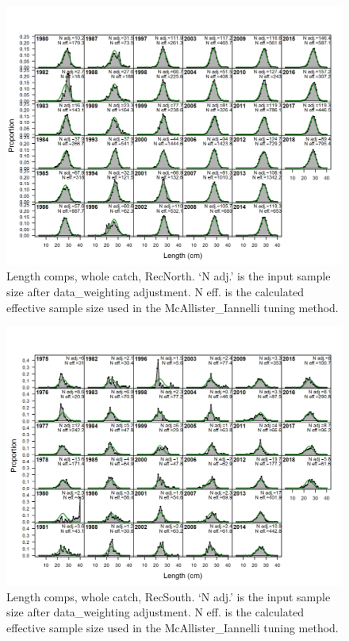\documentclass[12pt,]{article}
\begin{document}
\begin{figure}
\centering
\includegraphics{./r4ss/plots_mod1/comp_lenfit_flt3mkt0.png}
\caption{Length comps, whole catch, RecNorth. `N adj.' is the input
sample size after data\_weighting adjustment. N eff. is the calculated
effective sample size used in the McAllister\_Iannelli tuning method.
\label{fig:mod1_3_comp_lenfit_flt3mkt0}}
\end{figure}

\begin{figure}
\centering
\includegraphics{./r4ss/plots_mod1/comp_lenfit_flt4mkt0.png}
\caption{Length comps, whole catch, RecSouth. `N adj.' is the input
sample size after data\_weighting adjustment. N eff. is the calculated
effective sample size used in the McAllister\_Iannelli tuning method.
\label{fig:mod1_4_comp_lenfit_flt4mkt0}}
\end{figure}
\end{document}

